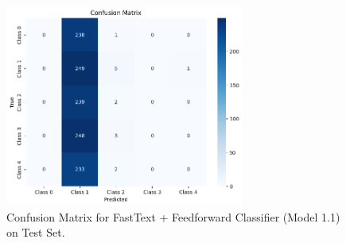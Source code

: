 \documentclass[10.5pt]{article}
\begin{document}
\begin{figure}[htbp]
    \centering
    \includegraphics[width=0.7\textwidth]{images/model1_1_confusion_matrix.png}
    \caption{Confusion Matrix for FastText + Feedforward Classifier (Model 1.1) on Test Set.}
    \label{fig:conf_matrix_model1_1}
\end{figure}
\end{document}
